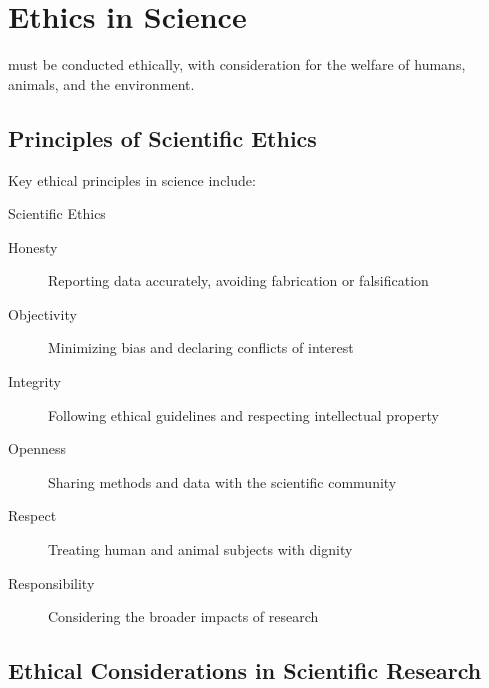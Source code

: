 
\section{Ethics in Science}

 must be conducted ethically, with consideration for the welfare of humans, animals, and the environment.

\subsection{Principles of Scientific Ethics}

Key ethical principles in science include:

\begin{keyconcept}{Scientific Ethics}
\begin{description}
    \item[Honesty] Reporting data accurately, avoiding fabrication or falsification
    \item[Objectivity] Minimizing bias and declaring conflicts of interest
    \item[Integrity] Following ethical guidelines and respecting intellectual property
    \item[Openness] Sharing methods and data with the scientific community
    \item[Respect] Treating human and animal subjects with dignity
    \item[Responsibility] Considering the broader impacts of research
\end{description}
\end{keyconcept}


\subsection{Ethical Considerations in Scientific Research}

